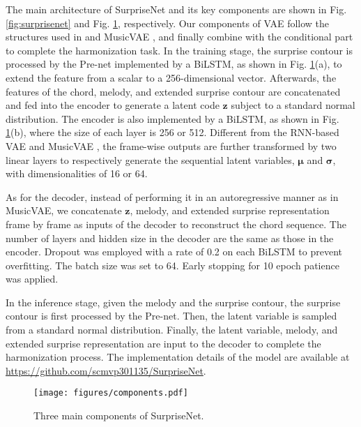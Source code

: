 \documentclass{article}
\begin{document}
The main architecture of SurpriseNet and its key components are shown in Fig. \ref{fig:surprisenet} and Fig. \ref{fig:components}, respectively. Our components of VAE follow the structures used in \cite{Bowman2016} and MusicVAE \cite{Roberts2018}, and finally combine with the conditional part \cite{Sohn2015} to complete the harmonization task. In the training stage, the surprise contour is processed by the Pre-net implemented by a BiLSTM, as shown in Fig. \ref{fig:components}(a), to extend the feature from a scalar to a 256-dimensional vector. Afterwards, the features of the chord, melody, and extended surprise contour are concatenated and fed into the encoder to generate a latent code $\mathbf{z}$ subject to a standard normal distribution. The encoder is also implemented by a BiLSTM, as shown in Fig. \ref{fig:components}(b), where the size of each layer is 256 or 512. Different from the RNN-based VAE \cite{Bowman2016} and MusicVAE \cite{Roberts2018}, the frame-wise outputs are further transformed by two linear layers to respectively generate the sequential latent variables, $\bm\mu$ and $\bm\sigma$, with dimensionalities of 16 or 64.

As for the decoder, instead of performing it in an autoregressive manner as in MusicVAE, we concatenate $\mathbf{z}$, melody, and extended surprise representation frame by frame as inputs of the decoder to reconstruct the chord sequence. The number of layers and hidden size in the decoder are the same as those in the encoder. Dropout was employed with a rate of 0.2 on each BiLSTM to prevent overfitting. The batch size was set to 64. Early stopping for 10 epoch patience was applied.

In the inference stage, given the melody and the surprise contour, the surprise contour is first processed by the Pre-net. Then, the latent variable is sampled from a standard normal distribution. Finally, the latent variable, melody, and extended surprise representation are input to the decoder to complete the harmonization process. The implementation details of the model are available at \url{https://github.com/scmvp301135/SurpriseNet}.

\begin{figure}[t]
\begin{center}
\texttt{[image: figures/components.pdf]}
\end{center}
\vspace{-15pt}
\caption{Three main components of SurpriseNet.}
\label{fig:components}
\vspace{-15pt}
\end{figure}
\end{document}
